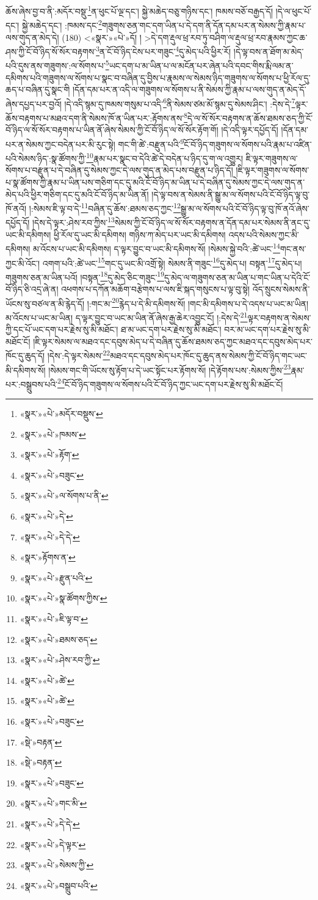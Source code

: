ཆོས་ཞེས་བྱ་བ་ནི་:མདོར་བསྡུ་\footnote{«སྣར་»«པེ་»མདོར་བསྡུས་}ན་ཕུང་པོ་ལྔ་དང་། སྐྱེ་མཆེད་བཅུ་གཉིས་དང་། ཁམས་བཅོ་བརྒྱད་དོ། །དེ་ལ་ཕུང་པོ་དང་། སྐྱེ་མཆེད་དང་། :ཁམས་དང་\footnote{«སྣར་»«པེ་»ཁམས་}གཟུགས་ཅན་གང་དག་ཡིན་པ་དེ་དག་ནི་དོན་དམ་པར་ན་སེམས་ཀྱི་རྣམ་པ་ལས་གུད་ན་མེད་དེ། (180) <«སྣར་»«པེ་»དོ། །
 >དེ་དག་རྡུལ་ཕྲ་རབ་ཏུ་བཤིག་ལ་རྡུལ་ཕྲ་རབ་རྣམས་ཀྱང་ཆ་ཤས་ཀྱི་ངོ་བོ་ཉིད་སོ་སོར་བརྟགས་\footnote{«སྣར་»«པེ་»རྟོག་}ན་ངོ་བོ་ཉིད་ངེས་པར་གཟུང་\footnote{«སྣར་»«པེ་»བཟུང་}དུ་མེད་པའི་ཕྱིར་རོ། །དེ་ལྟ་བས་ན་ཐོག་མ་མེད་པའི་དུས་ནས་གཟུགས་:ལ་སོགས་པ་\footnote{«སྣར་»«པེ་»ལ་སོགས་པ་ནི་}ཡང་དག་པ་མ་ཡིན་པ་ལ་མངོན་པར་ཞེན་པའི་དབང་གིས་རྨི་ལམ་ན་དམིགས་པའི་གཟུགས་ལ་སོགས་པ་སྣང་བ་བཞིན་དུ་བྱིས་པ་རྣམས་ལ་སེམས་ཉིད་གཟུགས་ལ་སོགས་པ་ཕྱི་རོལ་དུ་ཆད་པ་བཞིན་དུ་སྣང་གི །དོན་དམ་པར་ན་འདི་ལ་གཟུགས་ལ་སོགས་པ་ནི་སེམས་ཀྱི་རྣམ་པ་ལས་གུད་ན་མེད་དོ་ཞེས་དཔྱད་པར་བྱའོ། །དེ་འདི་སྙམ་དུ་ཁམས་གསུམ་པ་འདི་\footnote{«སྣར་»«པེ་»དེ་}ནི་སེམས་ཙམ་མོ་སྙམ་དུ་སེམས་ཤིང་། :དེས་དེ་\footnote{«སྣར་»«པེ་»དེ་དེ་}ལྟར་ཆོས་བརྟགས་པ་མཐའ་དག་ནི་སེམས་ཁོ་ན་ཡིན་པར་:རྟོགས་ནས་\footnote{«སྣར་»རྟོགས་ན་}དེ་ལ་སོ་སོར་བརྟགས་ན་ཆོས་ཐམས་ཅད་ཀྱི་ངོ་བོ་ཉིད་ལ་སོ་སོར་བརྟགས་པ་ཡིན་ནོ་ཞེས་སེམས་ཀྱི་ངོ་བོ་ཉིད་ལ་སོ་སོར་རྟོག་གོ། །དེ་འདི་ལྟར་དཔྱོད་དོ། །དོན་དམ་པར་ན་སེམས་ཀྱང་བདེན་པར་མི་རུང་སྟེ། གང་གི་ཚེ་:བརྫུན་པའི་\footnote{«སྣར་»«པེ་»རྫུན་པའི་}ངོ་བོ་ཉིད་གཟུགས་ལ་སོགས་པའི་རྣམ་པ་འཛིན་པའི་སེམས་ཉིད་:སྣ་ཚོགས་ཀྱི་\footnote{«སྣར་»«པེ་»སྣ་ཚོགས་ཀྱིས་}རྣམ་པར་སྣང་བ་དེའི་ཚེ་དེ་བདེན་པ་ཉིད་དུ་ག་ལ་འགྱུར། ཇི་ལྟར་གཟུགས་ལ་སོགས་པ་བརྫུན་པ་དེ་བཞིན་དུ་སེམས་ཀྱང་དེ་ལས་གུད་ན་མེད་པས་བརྫུན་པ་ཉིད་དོ། །ཇི་ལྟར་གཟུགས་ལ་སོགས་པ་སྣ་ཚོགས་ཀྱི་རྣམ་པ་ཡིན་པས་གཅིག་དང་དུ་མའི་ངོ་བོ་ཉིད་མ་ཡིན་པ་དེ་བཞིན་དུ་སེམས་ཀྱང་དེ་ལས་གུད་ན་མེད་པའི་ཕྱིར་གཅིག་དང་དུ་མའི་ངོ་བོ་ཉིད་མ་ཡིན་ནོ། །དེ་ལྟ་བས་ན་སེམས་ནི་སྒྱུ་མ་ལ་སོགས་པའི་ངོ་བོ་ཉིད་ལྟ་བུ་ཁོ་ནའོ། །:སེམས་ཇི་ལྟ་བ་དེ་\footnote{«སྣར་»«པེ་»ཇི་ལྟ་བ་}བཞིན་དུ་ཆོས་:ཐམས་ཅད་ཀྱང་\footnote{«སྣར་»«པེ་»ཐམས་ཅད་}སྒྱུ་མ་ལ་སོགས་པའི་ངོ་བོ་ཉིད་ལྟ་བུ་ཁོ་ནའོ་ཞེས་དཔྱོད་དོ། །དེས་དེ་ལྟར་:ཤེས་རབ་ཀྱིས་\footnote{«སྣར་»«པེ་»ཤེས་རབ་ཀྱི་}སེམས་ཀྱི་ངོ་བོ་ཉིད་ལ་སོ་སོར་བརྟགས་ན་དོན་དམ་པར་སེམས་ནི་ནང་དུ་ཡང་མི་དམིགས། ཕྱི་རོལ་དུ་ཡང་མི་དམིགས། གཉིས་ཀ་མེད་པར་ཡང་མི་དམིགས། འདས་པའི་སེམས་ཀྱང་མི་དམིགས། མ་འོངས་པ་ཡང་མི་དམིགས། ད་ལྟར་བྱུང་བ་ཡང་མི་དམིགས་སོ། །སེམས་སྐྱེ་བའི་:ཚེ་ཡང་\footnote{«སྣར་»«པེ་»ཚེ་}གང་ནས་ཀྱང་མི་འོང་། འགག་པའི་:ཚེ་ཡང་\footnote{«སྣར་»«པེ་»ཚེ་}གང་དུ་ཡང་མི་འགྲོ་སྟེ། སེམས་ནི་གཟུང་\footnote{«སྣར་»«པེ་»བཟུང་}དུ་མེད་པ། བསྟན་\footnote{«སྡེ་»བརྟན་}དུ་མེད་པ། གཟུགས་ཅན་མ་ཡིན་པའོ། །བསྟན་\footnote{«སྡེ་»བརྟན་}དུ་མེད་ཅིང་གཟུང་\footnote{«སྣར་»«པེ་»བཟུང་}དུ་མེད་ལ་གཟུགས་ཅན་མ་ཡིན་པ་གང་ཡིན་པ་དེའི་ངོ་བོ་ཉིད་ཅི་འདྲ་ཞེ་ན། འཕགས་པ་དཀོན་མཆོག་བརྩེགས་པ་ལས་ཇི་སྐད་གསུངས་པ་ལྟ་བུ་སྟེ། འོད་སྲུངས་སེམས་ནི་ཡོངས་སུ་བཙལ་ན་མི་རྙེད་དོ། །:གང་མ་\footnote{«སྣར་»«པེ་»གང་མི་}རྙེད་པ་དེ་མི་དམིགས་སོ། །གང་མི་དམིགས་པ་དེ་འདས་པ་ཡང་མ་ཡིན། མ་འོངས་པ་ཡང་མ་ཡིན། ད་ལྟར་བྱུང་བ་ཡང་མ་ཡིན་ནོ་ཞེས་རྒྱ་ཆེར་འབྱུང་ངོ། །:དེས་དེ་\footnote{«སྣར་»«པེ་»དེ་དེ་}ལྟར་བརྟགས་ན་སེམས་ཀྱི་དང་པོ་ཡང་དག་པར་རྗེས་སུ་མི་མཐོང་། ཐ་མ་ཡང་དག་པར་རྗེས་སུ་མི་མཐོང་། བར་མ་ཡང་དག་པར་རྗེས་སུ་མི་མཐོང་ངོ། །ཇི་ལྟར་སེམས་ལ་མཐའ་དང་དབུས་མེད་པ་དེ་བཞིན་དུ་ཆོས་ཐམས་ཅད་ཀྱང་མཐའ་དང་དབུས་མེད་པར་ཁོང་དུ་ཆུད་དོ། །དེས་:དེ་ལྟར་སེམས་\footnote{«སྣར་»«པེ་»དེ་ལྟར་}མཐའ་དང་དབུས་མེད་པར་ཁོང་དུ་ཆུད་ནས་སེམས་ཀྱི་ངོ་བོ་ཉིད་གང་ཡང་མི་དམིགས་སོ། །སེམས་གང་གི་ཡོངས་སུ་རྟོག་པ་དེ་ཡང་སྟོང་པར་རྟོགས་སོ། །དེ་རྟོགས་པས་:སེམས་ཀྱིས་\footnote{«སྣར་»«པེ་»སེམས་ཀྱི་}རྣམ་པར་:བསྒྲུབས་པའི་\footnote{«སྣར་»«པེ་»བསྒྲུབ་པའི་}ངོ་བོ་ཉིད་གཟུགས་ལ་སོགས་པའི་ངོ་བོ་ཉིད་ཀྱང་ཡང་དག་པར་རྗེས་སུ་མི་མཐོང་ངོ། 